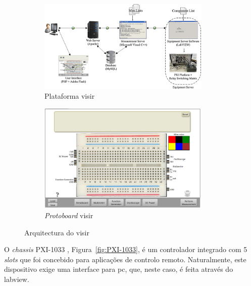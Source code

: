 \begin{figure}[hbtp]
    \centering
    \begin{subfigure}[hbtp]{0.48\textwidth}
        \centering
        \includegraphics[width=0.9\textwidth]{figures/arquitectura_VISIR.png}
        \caption{Plataforma \acrshort{visir} \cite{tawfikexperiences}}
        \label{fig:platvisir}
    \end{subfigure}
    \begin{subfigure}[hbtp]{0.48\textwidth}
        \includegraphics[width=0.9\textwidth]{figures/protboard_visir.png}
        \caption{\textit{Protoboard} \acrshort{visir}}
        \label{fig:protoboadrvisir}
    \end{subfigure}
    \caption{Arquitectura do \acrshort{visir}}
    \label{fig:arquitecturavisir}
\end{figure}

O \textit{chassis} PXI-1033 \cite{PXI-1033}, Figura~\ref{fig:PXI-1033}, é um controlador integrado com 5 \textit{slots} que foi concebido para aplicações de controlo remoto. Naturalmente, este dispositivo exige uma interface para \acrshort{pc}, que, neste caso, é feita através do \acrshort{labview}.

